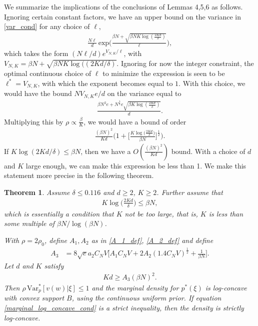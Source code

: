 \documentclass{article}
\numberwithin{equation}{section}
\theoremstyle{Lemma}
\theoremstyle{Corollary}
\theoremstyle{Theorem}
\newtheorem{theorem}{Theorem}
\theoremstyle{Remark}
\begin{document}
We summarize the implications of the conclusions of Lemmas 4,5,6 as follows. Ignoring certain constant factors, we have an upper bound on the variance in \eqref{var_cond} for any choice of $\ell$,
\begin{align}
    \frac{N \ell}{d}\,\text{exp}\Big( \frac{\beta N+\sqrt{\beta N K\log(\frac{2Kd}{\delta})}}{\ell} \Big),
\end{align}
which takes the form $(N\ell/d) e^{V_{N,K}/\ell}$, with $V_{N,K}=\beta N+\sqrt{\beta N K\log((2Kd/\delta)}$. Ignoring for now the integer constraint, the optimal continuous choice of $\ell$ to minimize the expression is seen to be $\ell^*=V_{N,K}$, with which the exponent becomes equal to $1$. With this choice, we would have the bound $N V_{N,K} e/d$ on the variance equal to
\begin{align}
    \frac{\beta N^{2} e+N^{\frac{3}{2}}e\sqrt{\beta K{\log(\frac{2Kd}{\delta})}}}{d}.
\end{align}
Multiplying this by $\rho \propto \frac{\beta}{K}$, we would have a bound of order
\begin{align}
    \frac{(\beta N)^{2}}{Kd}\Big(1+\Big[\frac{K\log\Big( \frac{2Kd}{\delta}\Big)}{\beta N}\Big]^{\frac{1}{2}}\Big).
\end{align}
If $K\log(2Kd/\delta) \leq \beta N$, then we have a $O(\frac{(\beta N)^{2}}{Kd})$ bound. With a choice of $d$ and $K$ large enough, we can make this expression be less than 1. We make this statement more precise in the following theorem.


\begin{theorem}\label{LogConcaveMarginal}
 Assume $\delta \le 0.116$ and $d\ge 2$, $ K \geq 2$.
Further assume that
 \begin{align}
    K\log\Big(\frac{2Kd}{\delta}\Big) \leq \beta N,
 \end{align}
which is essentially a condition that $K$ not be too large, that is, $K$ is less than some multiple of $\beta N/\log(\beta N)$.

With $\rho=2\rho_0$, define $A_{1}, A_{2}$ as in \eqref{A_1_def}, \eqref{A_2_def} and define 
\begin{align}
    A_{3}&=  8\sqrt{e}a_{2}C_{N}V\Big[A_1 C_N V+ 2 A_2 (1.4 C_{N}V)^{\frac{1}{2}}+ \frac{1}{\beta N}\Big].
\end{align}
Let $d$ and $K$ satisfy
\begin{align}
    Kd \geq A_{3}(\beta N)^{2} \label{marginal_log_concave_cond}.
\end{align}
Then $\rho\, \text{Var}_p^*[v(w)|\xi]\le 1$ and the marginal density for $p^{*}(\xi)$ is log-concave with convex support $B$, using the continuous uniform prior. If equation \eqref{marginal_log_concave_cond} is a strict inequality, then the density is strictly log-concave.
\end{theorem}
\end{document}
